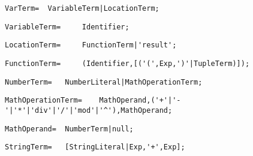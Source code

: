 \documentclass{article}
\begin{document}
    \begin{flushleft}
    \begin{lstlisting}[mathescape=true, breaklines=true]
      VarTerm= 	VariableTerm|LocationTerm;
    \end{lstlisting}
    \end{flushleft}
    \begin{flushleft}
    \begin{lstlisting}[mathescape=true, breaklines=true]
      VariableTerm= 	Identifier;
    \end{lstlisting}
    \end{flushleft}
    \begin{flushleft}
    \begin{lstlisting}[mathescape=true, breaklines=true]
      LocationTerm= 	FunctionTerm|'result';
    \end{lstlisting}
    \end{flushleft}
    \begin{flushleft}
    \begin{lstlisting}[mathescape=true, breaklines=true]
      FunctionTerm= 	(Identifier,[('(',Exp,')'|TupleTerm)]);
    \end{lstlisting}
    \end{flushleft}
    \begin{flushleft}
    \begin{lstlisting}[mathescape=true, breaklines=true]
      NumberTerm= 	NumberLiteral|MathOperationTerm;
    \end{lstlisting}
    \end{flushleft}
    \begin{flushleft}
    \begin{lstlisting}[mathescape=true, breaklines=true]
      MathOperationTerm= 	MathOperand,('+'|'-'|'*'|'div'|'/'|'mod'|'^'),MathOperand;
    \end{lstlisting}
    \end{flushleft}
    \begin{flushleft}
    \begin{lstlisting}[mathescape=true, breaklines=true]
      MathOperand= 	NumberTerm|null;
    \end{lstlisting}
    \end{flushleft}
    \begin{flushleft}
    \begin{lstlisting}[mathescape=true, breaklines=true]
      StringTerm= 	[StringLiteral|Exp,'+',Exp];
    \end{lstlisting}
    \end{flushleft}
\end{document}
